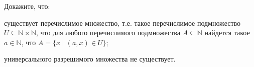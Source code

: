 Докажите, что:
\begin{enumcyr}
    \item существует  перечислимое множество, т.е. такое перечислимое подмножество
        $U \subseteq \mathbb{N} \times \mathbb{N}$, что для любого перечислимого подмножества $A
        \subseteq \mathbb{N}$ найдется такое $a \in \mathbb{N}$, что $A = \{x \mid (a, x) \in U\}$;
    \item универсального разрешимого множества не существует.
\end{enumcyr}